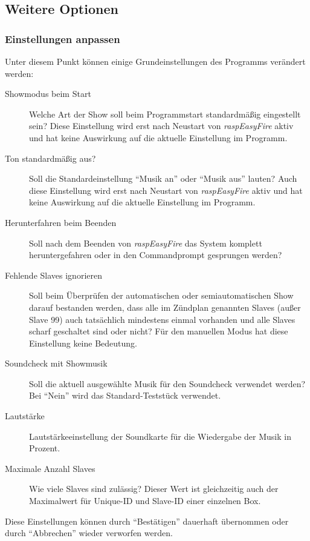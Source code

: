\documentclass[paper=a4, parskip, numbers=noenddot, toc=listof, headsepline]{scrbook}
\newcommand{\REF}{\emph{raspEasyFire}}
\begin{document}
			\subsection{Weitere Optionen}
				\subsubsection{Einstellungen anpassen}
					Unter diesem Punkt können einige Grundeinstellungen des Programms verändert werden:
					\begin{description}
						\item [Showmodus beim Start]
						      Welche Art der Show soll beim Programmstart standardmäßig eingestellt sein? Diese Einstellung wird erst nach Neustart von {\REF} aktiv und hat keine Auswirkung auf die aktuelle Einstellung im Programm.
						\item [Ton standardmäßig aus?]
						      Soll die Standardeinstellung \enquote{Musik an} oder \enquote{Musik aus} lauten? Auch diese Einstellung wird erst nach Neustart von {\REF} aktiv und hat keine Auswirkung auf die aktuelle Einstellung im Programm.
						\item [Herunterfahren beim Beenden]
						      Soll nach dem Beenden von {\REF} das System komplett heruntergefahren oder in den Commandprompt gesprungen werden?
						\item [Fehlende Slaves ignorieren]
						      Soll beim Überprüfen der automatischen oder semiautomatischen Show darauf bestanden werden, dass alle im Zündplan genannten Slaves (außer Slave 99) auch tatsächlich mindestens einmal vorhanden und alle Slaves scharf geschaltet sind oder nicht? Für den manuellen Modus hat diese Einstellung keine Bedeutung.
						\item [Soundcheck mit Showmusik]
							  Soll die aktuell ausgewählte Musik für den Soundcheck verwendet werden? Bei \enquote{Nein} wird das Standard-Teststück verwendet.
						\item [Lautstärke]
						      Lautstärkeeinstellung der Soundkarte für die Wiedergabe der Musik in Prozent.
						\item [Maximale Anzahl Slaves]
						      Wie viele Slaves sind zulässig? Dieser Wert ist gleichzeitig auch der Maximalwert für Unique-ID und Slave-ID einer einzelnen Box.
					\end{description}

					Diese Einstellungen können durch \enquote{Bestätigen} dauerhaft übernommen oder durch \enquote{Abbrechen} wieder verworfen werden.
\end{document}
